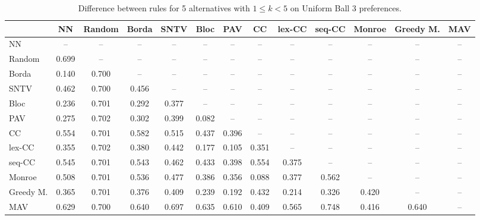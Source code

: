 
\begin{table*}[h!]
\centering
\begin{tabular}{lcccccccccccc}
\toprule
 & NN & Random & Borda & SNTV & Bloc & PAV & CC & lex-CC & seq-CC & Monroe & Greedy M. & MAV \\
\midrule
NN & -- & -- & -- & -- & -- & -- & -- & -- & -- & -- & -- & -- \\
Random & 0.699 & -- & -- & -- & -- & -- & -- & -- & -- & -- & -- & -- \\
Borda & 0.140 & 0.700 & -- & -- & -- & -- & -- & -- & -- & -- & -- & -- \\
SNTV & 0.462 & 0.700 & 0.456 & -- & -- & -- & -- & -- & -- & -- & -- & -- \\
Bloc & 0.236 & 0.701 & 0.292 & 0.377 & -- & -- & -- & -- & -- & -- & -- & -- \\
PAV & 0.275 & 0.702 & 0.302 & 0.399 & 0.082 & -- & -- & -- & -- & -- & -- & -- \\
CC & 0.554 & 0.701 & 0.582 & 0.515 & 0.437 & 0.396 & -- & -- & -- & -- & -- & -- \\
lex-CC & 0.355 & 0.702 & 0.380 & 0.442 & 0.177 & 0.105 & 0.351 & -- & -- & -- & -- & -- \\
seq-CC & 0.545 & 0.701 & 0.543 & 0.462 & 0.433 & 0.398 & 0.554 & 0.375 & -- & -- & -- & -- \\
Monroe & 0.508 & 0.701 & 0.536 & 0.477 & 0.386 & 0.356 & 0.088 & 0.377 & 0.562 & -- & -- & -- \\
Greedy M. & 0.365 & 0.701 & 0.376 & 0.409 & 0.239 & 0.192 & 0.432 & 0.214 & 0.326 & 0.420 & -- & -- \\
MAV & 0.629 & 0.700 & 0.640 & 0.697 & 0.635 & 0.610 & 0.409 & 0.565 & 0.748 & 0.416 & 0.640 & -- \\
\bottomrule
\end{tabular}

\caption{Difference between rules for 5 alternatives with $1 \leq k < 5$ on Uniform Ball 3 preferences.}
\end{table*}
